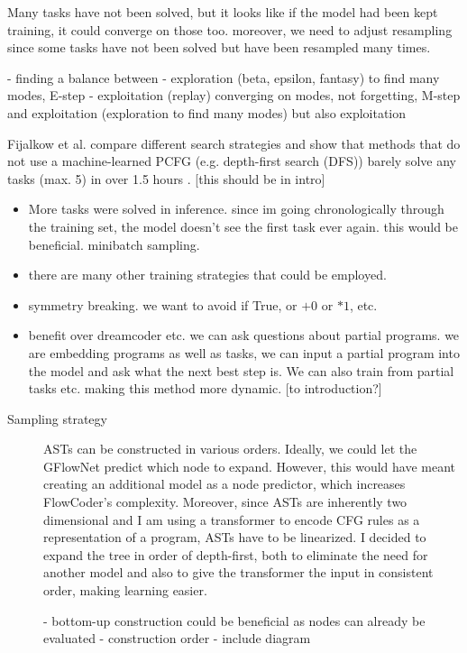 Many tasks have not been solved, but it looks like if the model had been kept training, it could converge on those too.
moreover, we need to adjust resampling since some tasks have not been solved but have been resampled many times.


- finding a balance between 
- exploration (beta, epsilon, fantasy) to find many modes, E-step
- exploitation (replay) converging on modes, not forgetting, M-step
and exploitation (exploration to find many modes) but also exploitation





Fijalkow et al. compare different search strategies and show that methods that do not use a machine-learned PCFG (e.g. depth-first search (DFS)) barely solve any tasks (max. 5) in over 1.5 hours \cite{fijalkow_scaling_2021}. [this should be in intro]


\begin{itemize}
    \item More tasks were solved in inference. since im going chronologically through the training set, the model doesn't see the first task ever again. this would be beneficial. minibatch sampling. 
    \item there are many other training strategies that could be employed.
    \item symmetry breaking. we want to avoid if True, or $+0$ or $*1$, etc.
\end{itemize}


\begin{itemize}
    \item benefit over dreamcoder etc. we can ask questions about partial programs. we are embedding programs as well as tasks, we can input a partial program into the model and ask what the next best step is. We can also train from partial tasks etc. making this method more dynamic. [to introduction?]
\end{itemize}



\begin{description}
    \item[Sampling strategy] ASTs can be constructed in various orders. Ideally, we could let the GFlowNet predict which node to expand. However, this would have meant creating an additional model as a node predictor, which increases FlowCoder's complexity. Moreover, since ASTs are inherently two dimensional and I am using a transformer to encode CFG rules as a representation of a program, ASTs have to be linearized. I decided to expand the tree in order of depth-first, both to eliminate the need for another model and also to give the transformer the input in consistent order, making learning easier. 
    \item[] - bottom-up construction could be beneficial as nodes can already be evaluated
    - construction order
    - include diagram
\end{description}










